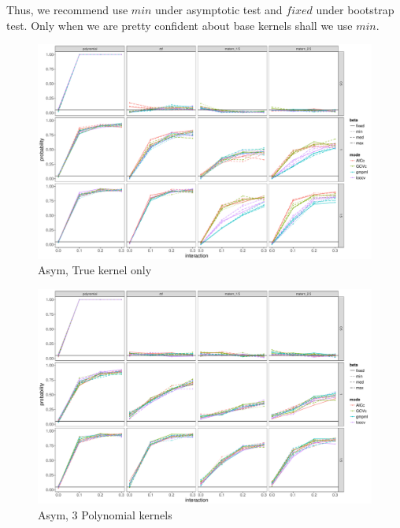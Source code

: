 \documentclass[11pt]{article}
\begin{document}
Thus, we recommend use $min$ under asymptotic test and $fixed$ under bootstrap test. Only when we are pretty confident about base kernels shall we use $min$.

\clearpage
\begin{figure}
\begin{center}
\includegraphics[width=0.9\columnwidth]{exp_A1} 
\caption{Asym, True kernel only}
\label{fig:res}
\end{center}
\end{figure}

\begin{figure}
\begin{center}
\includegraphics[width=0.9\columnwidth]{exp_A2} 
\caption{Asym, 3 Polynomial kernels}
\label{fig:res}
\end{center}
\end{figure}
\end{document}
